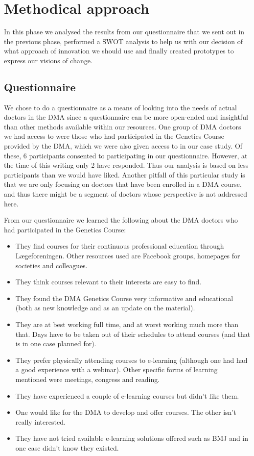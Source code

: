 \section{Methodical approach}
In this phase we analysed the results from our questionnaire that we sent out in the previous phase, performed a SWOT analysis to help us with our decision of what approach of innovation we should use and finally created prototypes to express our visions of change.

\subsection{Questionnaire}
We chose to do a questionnaire as a means of looking into the needs of actual doctors in the DMA since a questionnaire can be more open-ended and insightful than other methods available within our resources. One group of DMA doctors we had access to were those who had participated in the Genetics Course provided by the DMA, which we were also given access to in our case study. Of these, 6 participants consented to participating in our questionnaire. However, at the time of this writing only 2 have responded. Thus our analysis is based on less participants than we would have liked. Another pitfall of this particular study is that we are only focusing on doctors that have been enrolled in a DMA course, and thus there might be a segment of doctors whose perspective is not addressed here.

From our questionnaire we learned the following about the DMA doctors who had participated in the Genetics Course:
\begin{itemize}
\item They find courses for their continuous professional education through Lægeforeningen. Other resources used are Facebook groups, homepages for societies and colleagues.
\item They think courses relevant to their interests are easy to find.
\item They found the DMA Genetics Course very informative and educational (both as new knowledge and as an update on the material).
\item They are at best working full time, and at worst working much more than that. Days have to be taken out of their schedules to attend courses (and that is in one case planned for).
\item They prefer physically attending courses to e-learning (although one had had a good experience with a webinar). Other specific forms of learning mentioned were meetings, congress and reading.
\item They have experienced a couple of e-learning courses but didn't like them.
\item One would like for the DMA to develop and offer courses. The other isn't really interested.
\item They have not tried available e-learning solutions offered such as BMJ and in one case didn't know they existed.
\end{itemize}

